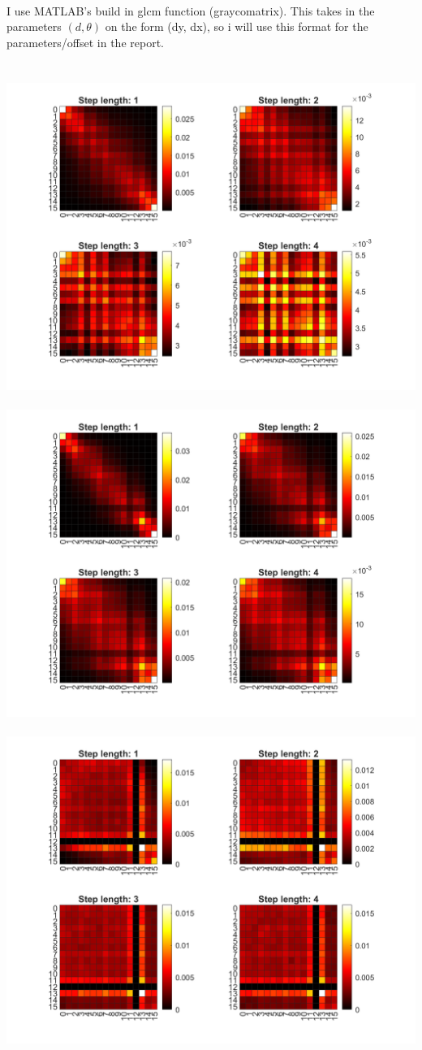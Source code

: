 \documentclass[12pt, letterpaper, twoside]{article}
\begin{document}
\ \\
I use MATLAB's build in glcm function (graycomatrix). This takes in the parameters $(d, \theta)$ on the form (dy, dx), so i will use this format for the parameters/offset in the report.\\
\ \\
\ \\
\includegraphics[scale=0.4]{"glcm1.png"}
\ \\
\includegraphics[scale=0.4]{"glcm2.png"}
\ \\
\includegraphics[scale=0.4]{"glcm3.png"}
\end{document}
